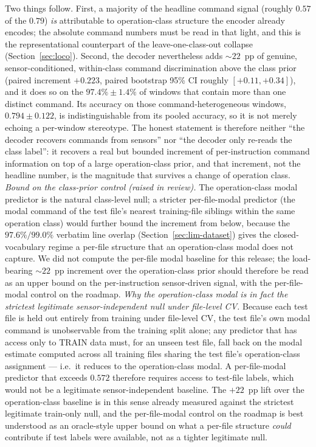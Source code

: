 \documentclass[sensors,article,submit,moreauthors,pdftex]{Definitions/mdpi}
\begin{document}
Two things follow. First, a majority of the headline command signal (roughly $0.57$ of the $0.79$) \emph{is} attributable to operation-class structure the encoder already encodes; the absolute command numbers must be read in that light, and this is the representational counterpart of the leave-one-class-out collapse (Section~\ref{sec:loco}). Second, the decoder nevertheless adds $\sim\!22$~pp of genuine, sensor-conditioned, within-class command discrimination above the class prior (paired increment $+0.223$, paired bootstrap 95\% CI roughly $[+0.11, +0.34]$), and it does so on the $97.4\% \pm 1.4\%$ of windows that contain more than one distinct command. Its accuracy on those command-heterogeneous windows, $0.794 \pm 0.122$, is indistinguishable from its pooled accuracy, so it is not merely echoing a per-window stereotype. The honest statement is therefore neither ``the decoder recovers commands from sensors'' nor ``the decoder only re-reads the class label'': it recovers a real but bounded increment of per-instruction command information on top of a large operation-class prior, and that increment, not the headline number, is the magnitude that survives a change of operation class. \emph{Bound on the class-prior control (raised in review).} The operation-class modal predictor is the natural class-level null; a stricter per-file-modal predictor (the modal command of the test file's nearest training-file siblings within the same operation class) would further bound the increment from below, because the $97.6\%/99.0\%$ verbatim line overlap (Section~\ref{sec:lim-dataset}) gives the closed-vocabulary regime a per-file structure that an operation-class modal does not capture. We did not compute the per-file modal baseline for this release; the load-bearing $\sim\!22$~pp increment over the operation-class prior should therefore be read as an upper bound on the per-instruction sensor-driven signal, with the per-file-modal control on the roadmap. \emph{Why the operation-class modal is in fact the strictest legitimate sensor-independent null under file-level CV.} Because each test file is held out entirely from training under file-level CV, the test file's own modal command is unobservable from the training split alone; any predictor that has access only to TRAIN data must, for an unseen test file, fall back on the modal estimate computed across all training files sharing the test file's operation-class assignment --- i.e.\ it reduces to the operation-class modal. A per-file-modal predictor that exceeds $0.572$ therefore requires access to test-file labels, which would not be a legitimate sensor-independent baseline. The $+22$~pp lift over the operation-class baseline is in this sense already measured against the strictest legitimate train-only null, and the per-file-modal control on the roadmap is best understood as an oracle-style upper bound on what a per-file structure \emph{could} contribute if test labels were available, not as a tighter legitimate null.
\end{document}
